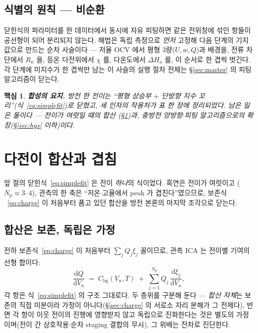\documentclass[11pt,a4paper]{article}
\newtheorem*{keybox}{핵심}
\newcommand{\dd}{\mathrm{d}}
\newcommand{\bg}{\mathrm{bg}}
\begin{document}
\subsection{식별의 원칙 — 비순환}
닫힌식의 파라미터를 한 데이터에서 동시에 자유 피팅하면 같은 전위창에 섞인 항들이 공선형이 되어 분리되지
않는다. 해법은 독립 측정으로 \emph{먼저} 고정해 다음 단계의 기지값으로 만드는 순차 사슬이다 — 저율
OCV 에서 평형 3량($U,w,Q$)과 배경을, 전류 차단에서 $R_n$ 을, 등온 다전위에서 $\chi$ 를, 다온도에서
$\Delta H_a$ 를, 이 순서로 한 겹씩 벗긴다. 각 단계에 미지수가 한 겹씩만 남는 이 사슬의 실행 절차 전체는
\S\ref{sec:master} 의 피팅 알고리즘이 닫는다.

\begin{keybox}
\textbf{합성의 요지.} 방전 한 전이는 ``평형 상승부 $+$ 단방향 지수 꼬리''(식~\eqref{eq:simplefit})로
닫혔고, 세 인자의 작용처가 표 한 장에 정리되었다. 남은 일은 둘이다 — 전이가 여럿일 때의 합산
(\S\ref{sec:overlap})과, 충방전 양방향$\cdot$피팅 알고리즘으로의 확장(\S\ref{sec:hys} 이하)이다.
\end{keybox}

\section{다전이 합산과 겹침}\label{sec:overlap}
앞 절의 닫힌식~\eqref{eq:simplefit} 은 전이 \emph{하나}의 식이었다. 흑연은 전이가 여럿이고
($N_p\approx3$--$4$), 관측의 한 축은 ``저온$\cdot$고율에서 peak 가 겹친다''였으므로, 보존식
~\eqref{eq:charge} 이 처음부터 품고 있던 합산을 방전 본론의 마지막 조각으로 닫는다.

\subsection{합산은 보존, 독립은 가정}
전하 보존식~\eqref{eq:charge} 이 처음부터 $\sum_jQ_j\xi_j$ 꼴이므로, 관측 ICA 는 전이별 기여의 선형
합이다:
\begin{equation}
\frac{\dd Q}{\dd V_n}\;=\;C_\bg(V_n,T)\;+\;\sum_{j=1}^{N_p}Q_j\,\frac{\dd\xi_j}{\dd V_n},
\label{eq:total}
\end{equation}
각 항은 식~\eqref{eq:simplefit} 의 구조 그대로다. 두 층위를 구분해 둔다 — \emph{합산 자체}는 보존의 직접
미분이라 가정이 아니다(\S\ref{sec:charge} 의 서로소 자리 분해가 그 전제다). 반면 각 항이 이웃 전이의 진행에 영향받지 않고 독립으로 진화한다는 것은 별도의
가정이며(전이 간 상호작용$\cdot$순차 staging 결합의 무시), 그 위배는 잔차로 진단한다.
\end{document}
